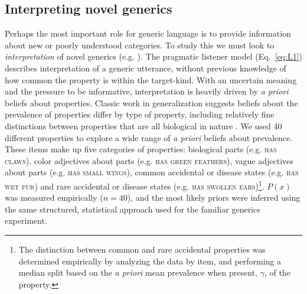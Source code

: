 \documentclass{pnastwo}
\begin{document}
\begin{article}

\subsection{Interpreting novel generics}
Perhaps the most important role for generic language is to provide information about new or poorly understood categories. 
To study this we must look to \emph{interpretation} of novel generics (e.g. \cite{Gelman2002, Cimpian2010}).
The pragmatic listener model (Eq.~\ref{eq:L1}) describes interpretation of a generic utterance, without previous knowledge of how common the property is within the target-kind. 
With an uncertain meaning and the pressure to be informative, interpretation is heavily driven by \emph{a priori} beliefs about properties. 
Classic work in generalization suggests beliefs about the prevalence of properties differ by type of property, including relatively fine distinctions between properties that are all biological in nature \cite{Nisbett1983}. 
We used 40 different properties to explore a wide range of \emph{a priori} beliefs about prevalence. 
These items make up five categories of properties: biological parts (e.g. \textsc{has claws}), color adjectives about parts (e.g. \textsc{has green feathers}), vague adjectives about parts (e.g. \textsc{has small wings}),  common accidental or disease states (e.g. \textsc{has wet fur}) and rare accidental or disease states (e.g. \textsc{has swollen ears})\footnote{The distinction between common and rare accidental properties was determined empirically by analyzing the data by item, and performing a median split based on the \emph{a priori} mean prevalence when present, $\gamma$, of the property.}.
$P(x)$ was measured empirically ($n=40$), and the most likely priors were inferred using the same structured, statistical approach used for the familiar generics experiment.


\end{article}
\end{document}

